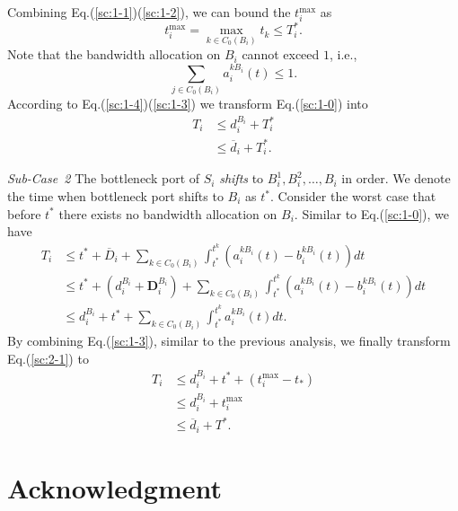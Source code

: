 \documentclass[10pt, conference, letterpaper]{IEEEtran}
\begin{document}
\begin{IEEEproof}
Combining Eq.(\ref{sc:1-1})(\ref{sc:1-2}), we can bound the $t_i^{\text{max}}$ as
\begin{equation}\label{sc:1-4}
	t_i^{\text{max}} = \max_{k \in C_0(B_i)} t_k \leq T_i^*.
\end{equation}
Note that the bandwidth allocation on $B_i$ cannot exceed $1$, i.e.,
\begin{equation}\label{sc:1-3}
	\sum_{j \in C_0(B_i)} a_i^{kB_i}(t) \leq 1.
\end{equation}
According to Eq.(\ref{sc:1-4})(\ref{sc:1-3}) we transform Eq.(\ref{sc:1-0}) into
\begin{equation}
	\begin{aligned}
		T_i & \leq d_i^{B_i} + T_i^*\\
		& \leq \overline{d}_i + T_i^*.
	\end{aligned}
\end{equation}

\emph{Sub-Case~2} The bottleneck port of $S_i$ \emph{shifts} to $B_i^1,B_i^2,\dots,B_i$ in order. We denote the time when bottleneck port shifts to $B_i$ as $t^*$. Consider the worst case that before $t^*$ there exists no bandwidth allocation on $B_i$. Similar to Eq.(\ref{sc:1-0}), we have
\begin{equation}\label{sc:2-1}
	\begin{aligned}
		T_i & \leq t^* + \overline{D}_i + \sum_{k \in C_0(B_i)}\int_{t^*}^{t^k}(a_i^{kB_i}(t)-b_i^{kB_i}(t))dt\\
		& \leq t^* + (d_i^{B_i} + \mathbf{D}_i^{B_i}) + \sum_{k \in C_0(B_i)}\int_{t^*}^{t^k}(a_i^{kB_i}(t)-b_i^{kB_i}(t))dt\\
		& \leq d_i^{B_i} + t^* + \sum_{k \in C_0(B_i)}\int_{t^*}^{t^k} a_i^{kB_i}(t)dt.
	\end{aligned}
\end{equation}
By combining Eq.(\ref{sc:1-3}), similar to the previous analysis, we finally transform Eq.(\ref{sc:2-1}) to
\begin{equation}
	\begin{aligned}
		T_i & \leq d_i^{B_i} + t^* + (t_i^{\text{max}} - t_*)\\
		& \leq d_i^{B_i} + t_i^{\text{max}}\\
		& \leq \overline{d}_i + T^*.
	\end{aligned}
\end{equation}
\end{IEEEproof}

\section*{Acknowledgment}
\end{document}
